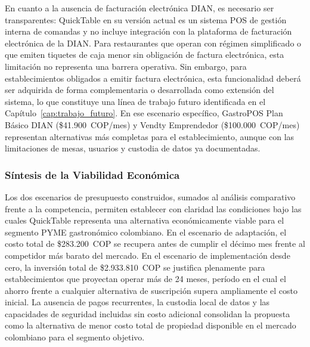 En cuanto a la ausencia de facturación electrónica DIAN, es necesario ser transparentes:
QuickTable en su versión actual es un sistema POS de gestión interna de comandas y no
incluye integración con la plataforma de facturación electrónica de la DIAN. Para
restaurantes que operan con régimen simplificado o que emiten tiquetes de caja menor sin
obligación de factura electrónica, esta limitación no representa una barrera operativa.
Sin embargo, para establecimientos obligados a emitir factura electrónica, esta
funcionalidad deberá ser adquirida de forma complementaria o desarrollada como extensión
del sistema, lo que constituye una línea de trabajo futuro identificada en el
Capítulo~\ref{cap:trabajo_futuro}. En ese escenario específico, GastroPOS Plan Básico
DIAN (\$41.900~COP/mes) y Vendty Emprendedor (\$100.000~COP/mes) representan
alternativas más completas para el establecimiento, aunque con las limitaciones de
mesas, usuarios y custodia de datos ya documentadas.

\subsubsection*{Síntesis de la Viabilidad Económica}

Los dos escenarios de presupuesto construidos, sumados al análisis comparativo frente
a la competencia, permiten establecer con claridad las condiciones bajo las cuales
QuickTable representa una alternativa económicamente viable para el segmento PYME
gastronómico colombiano. En el escenario de adaptación, el costo total de \$283.200~COP
se recupera antes de cumplir el décimo mes frente al competidor más barato del mercado.
En el escenario de implementación desde cero, la inversión total de \$2.933.810~COP
se justifica plenamente para establecimientos que proyectan operar más de 24 meses,
período en el cual el ahorro frente a cualquier alternativa de suscripción supera
ampliamente el costo inicial. La ausencia de pagos recurrentes, la custodia local de
datos y las capacidades de seguridad incluidas sin costo adicional consolidan la
propuesta como la alternativa de menor costo total de propiedad disponible en el
mercado colombiano para el segmento objetivo.